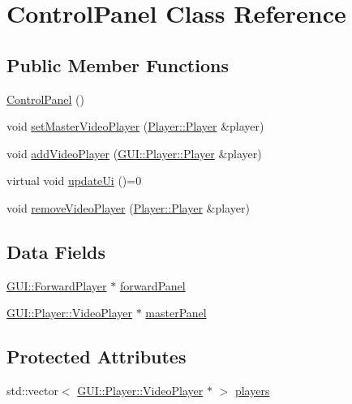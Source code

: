 \hypertarget{classGUI_1_1Player_1_1ControlPanel}{}\section{Control\+Panel Class Reference}
\label{classGUI_1_1Player_1_1ControlPanel}
\subsection*{Public Member Functions}
\begin{DoxyCompactItemize}
\item 
\hyperlink{classGUI_1_1Player_1_1ControlPanel_a0efa607fe77b973e1128eae3bb33a9a1}{Control\+Panel} ()
\item 
void \hyperlink{classGUI_1_1Player_1_1ControlPanel_a798f5ffd7fe32e3fe8f67feed1e555c4}{set\+Master\+Video\+Player} (\hyperlink{classGUI_1_1Player_1_1Player}{Player\+::\+Player} \&player)
\item 
void \hyperlink{classGUI_1_1Player_1_1ControlPanel_ae904f1cf74c2473c9c548a255e67d88d}{add\+Video\+Player} (\hyperlink{classGUI_1_1Player_1_1Player}{G\+U\+I\+::\+Player\+::\+Player} \&player)
\item 
virtual void \hyperlink{classGUI_1_1Player_1_1ControlPanel_aa9963358cf9cff5ea2531d73efa78f73}{update\+Ui} ()=0
\item 
void \hyperlink{classGUI_1_1Player_1_1ControlPanel_aa24579c43e90697b0b05662270dfca3f}{remove\+Video\+Player} (\hyperlink{classGUI_1_1Player_1_1Player}{Player\+::\+Player} \&player)
\end{DoxyCompactItemize}
\subsection*{Data Fields}
\begin{DoxyCompactItemize}
\item 
\hyperlink{classGUI_1_1ForwardPlayer}{G\+U\+I\+::\+Forward\+Player} $\ast$ \hyperlink{classGUI_1_1Player_1_1ControlPanel_a15dc5e66f941f96f5b10d4da627f7f4e}{forward\+Panel}
\item 
\hyperlink{classGUI_1_1Player_1_1VideoPlayer}{G\+U\+I\+::\+Player\+::\+Video\+Player} $\ast$ \hyperlink{classGUI_1_1Player_1_1ControlPanel_a87e40dd85b4d49e1618debba5269e676}{master\+Panel}
\end{DoxyCompactItemize}
\subsection*{Protected Attributes}
\begin{DoxyCompactItemize}
\item 
std\+::vector$<$ \hyperlink{classGUI_1_1Player_1_1VideoPlayer}{G\+U\+I\+::\+Player\+::\+Video\+Player} $\ast$ $>$ \hyperlink{classGUI_1_1Player_1_1ControlPanel_a037ac66fc05dbb9755f983e0fe02ca80}{players}
\end{DoxyCompactItemize}


